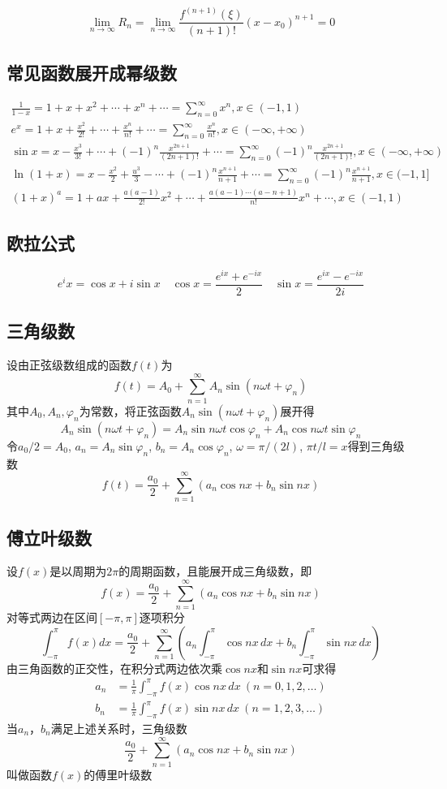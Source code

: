 \[\lim_{n\to\infty}R_n=\lim_{n\to\infty}\frac{f^{(n+1)}(\xi)}{(n+1) !}\left(x-x_{0}\right)^{n+1}=0\]

\subsection{常见函数展开成幂级数}
\begin{gather*}
    \frac{1}{1-x} =1+x+x^2+\cdots+x^n+\cdots=\sum_{n=0}^\infty x^n,x\in(-1,1)\\
    e^x=1+x+\frac{x^2}{2!}+\cdots+\frac{x^n}{n!}+\cdots=\sum_{n=0}^\infty \frac{x^n}{n!},x\in(-\infty,+\infty)\\
    \sin x=x-\frac{x^3}{3!}+\cdots+(-1)^n\frac{x^{2n+1}}{(2n+1)!}+\cdots=\sum_{n=0}^\infty (-1)^n\frac{x^{2n+1}}{(2n+1)!},x\in(-\infty,+\infty)\\
    \ln(1+x)=x-\frac{x^2}{2}+\frac{u^3}{3}-\cdots+(-1)^n\frac{x^{n+1}}{n+1}+\cdots=\sum_{n=0}^\infty (-1)^n\frac{x^{n+1}}{n+1},x\in(-1,1]\\
    (1+x)^a=1+ax+\frac{a(a-1)}{2!}x^2+\cdots+\frac{a(a-1)\cdots(a-n+1)}{n!}x^n+\cdots,x\in(-1,1)
\end{gather*}

\subsection{欧拉公式}
\[e^ix=\cos x+i\sin x\quad \cos x=\frac{e^{ix}+e^{-ix}}{2}\quad \sin x=\frac{e^{ix}-e^{-ix}}{2i}\]
\subsection{三角级数}
设由正弦级数组成的函数$f(t)$为
\[f(t)=A_0+\sum_{n=1}^\infty A_n\sin (n\omega t+\varphi_n)\]
其中$A_0,A_n,\varphi_n$为常数，将正弦函数$A_n\sin (n\omega t+\varphi_n)$展开得
\[A_n\sin (n\omega t+\varphi_n)=A_n\sin n\omega t\cos \varphi_n+A_n\cos n\omega t\sin \varphi_n\]
令$a_0/2=A_0$, $a_n=A_n\sin \varphi_n$, $b_n=A_n\cos \varphi_n$,
$\omega=\pi/(2l)$, $\pi t/l=x$得到三角级数
\[f(t)=\frac{a_0}{2}+\sum_{n=1}^\infty \left(a_n\cos nx+b_n\sin nx \right)\]
\subsection{傅立叶级数}
设$f(x)$是以周期为$2\pi$的周期函数，且能展开成三角级数，即
\[f(x)=\frac{a_0}{2}+\sum_{n=1}^\infty \left(a_n\cos nx+b_n\sin nx \right)\]
对等式两边在区间$[-\pi,\pi]$逐项积分
\[\int_{-\pi}^\pi f(x)dx=\frac{a_0}{2}+\sum_{n=1}^\infty \left(a_n
\int_{-\pi}^\pi \cos nx\, dx+b_n \int_{-\pi}^\pi \sin nx\, dx\right)\]
由三角函数的正交性，在积分式两边依次乘$\cos nx$和$\sin nx$可求得
\begin{align*}
    a_n&=\frac 1\pi \int_{-\pi}^\pi f(x)\cos nx\, dx\ (n=0,1,2,\ldots)\\
    b_n&=\frac 1\pi \int_{-\pi}^\pi f(x)\sin nx\, dx\ (n=1,2,3,\ldots)
\end{align*}
当$a_n$，$b_n$满足上述关系时，三角级数
\[\frac{a_0}{2}+\sum_{n=1}^\infty \left(a_n\cos nx+b_n\sin nx \right)\]
叫做函数$f(x)$的傅里叶级数
